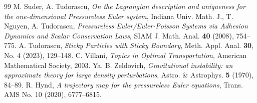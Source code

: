 \documentclass[10pt,a4paper]{amsart}
\numberwithin{equation}{section}
\begin{document}
\begin{thebibliography}{99}
 {\sc M. Suder, A. Tudorascu}, {\em On the Lagrangian description and uniqueness for the one-dimensional Pressureless Euler system}, Indiana Univ. Math. J., %
 {\sc T. Nguyen, A. Tudorascu}, \emph{Pressureless Euler/Euler-Poisson Systems via Adhesion Dynamics and Scalar Conservation Laws}, SIAM J. Math. Anal. \textbf{40} (2008), 754--775.
 {\sc A. Tudorascu}, {\em Sticky Particles with Sticky Boundary}, Meth. Appl. Anal. \textbf{30}, No. 4 (2023), 129--148.
 {\sc C. Villani}, \emph{Topics in Optimal Transportation}, American Mathematical Society, 2003.
 {\sc Ya. B. Zeldovich}, \emph{Gravitational instability: an approximate theory for large density perturbations}, Astro. \& Astrophys. \textbf{5} (1970), 84--89.
 {\sc R. Hynd}, \emph{A trajectory map for the pressureless Euler equations}, Trans. AMS No. 10 (2020), 6777--6815. %
\end{thebibliography}
\end{document}
